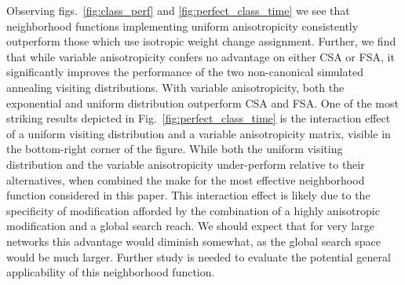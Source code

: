 \documentclass[11pt]{afthesis}
\begin{document}
	Observing figs.~\ref{fig:class_perf} and \ref{fig:perfect_class_time} we see that neighborhood functions implementing uniform anisotropicity consistently outperform those which use isotropic weight change assignment. Further, we find that while variable anisotropicity confers no advantage on either CSA or FSA, it significantly improves the performance of the two non-canonical simulated annealing visiting distributions. With variable anisotropicity, both the exponential and uniform distribution outperform CSA and FSA. One of the most striking results depicted in Fig.~\ref{fig:perfect_class_time} is the interaction effect of a uniform visiting distribution and a variable anisotropicity matrix, visible in the bottom-right corner of the figure. While both the uniform visiting distribution and the variable anisotropicity under-perform relative to their alternatives, when combined the make for the most effective neighborhood function considered in this paper. This interaction effect is likely due to the specificity of modification afforded by the combination of a highly anisotropic modification and a global search reach. We should expect that for very large networks this advantage would diminish somewhat, as the global search space would be much larger. Further study is needed to evaluate the potential general applicability of this neighborhood function.
	
\end{document}
